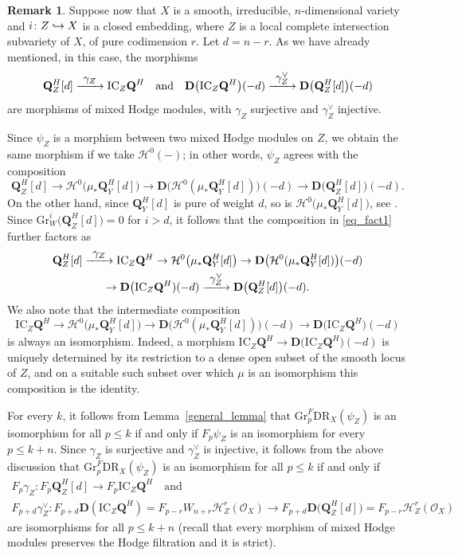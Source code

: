 \documentclass[JEP,XML,SOM,Unicode]{cedram}
\newcommand{\To}[1]{\mathchoice{\xrightarrow{\textstyle\kern4pt#1\kern3pt}}{\stackrel{#1}{\longrightarrow}}{}{}}
\newcommand\hto{\mathrel{\lhook\joinrel\to}}
\theoremstyle{plain}
\theoremstyle{definition}
\newtheorem{rmk}[thm]{Remark}
\newcommand\Q{{\mathbf Q}}
\newcommand\cH{\mathcal{H}}
\newcommand\cO{\mathcal{O}}
\newcommand\cH{\mathcal{H}}
\newcommand\cO{\mathcal{O}}
\newcommand\gr{\mathrm{Gr}}
\newcommand\DR{\mathrm{DR}}
\begin{document}
\begin{rmk}\label{rmk_two_morphisms}
Suppose now that $X$ is a smooth, irreducible, $n$-dimensional variety and $i\colon Z\hto X$ is a closed embedding,
where $Z$ is a local complete intersection subvariety of $X$, of pure codimension $r$. Let $d=n-r$.
As we have already mentioned, in this case, the morphisms
\[\Q^H_Z[d]\To{\gamma_Z}\mathrm{IC}_Z\Q^H\quad\text{and}\quad {\mathbf D}\big(\mathrm{IC}_Z\Q^H\big)(-d)
\To{\gamma_Z^{\vee}}{\mathbf D}\big(\Q^H_Z[d]\big)(-d)\]
are morphisms of mixed Hodge modules, with $\gamma_Z$ surjective and $\gamma_Z^{\vee}$ injective.

Since $\psi_Z$ is a morphism between two mixed Hodge modules on $Z$, we obtain the same morphism
if we take $\cH^0(-)$; in other words, $\psi_Z$ agrees with the composition
\begin{equation}\label{eq_fact1}
\Q_Z^H[d]\to \cH^0\big(\mu_*\Q_Y^H[d]\big)\to {\mathbf D}\big(\cH^0(\mu_*\Q_Y^H[d])\big)(-d)\to {\mathbf D}\big(\Q_Z^H[d]\big)(-d).
\end{equation}
On the other hand, since $\Q^H_Y[d]$ is pure of weight $d$, so is $\cH^0\big(\mu_*\Q_Y^H[d]\big)$, see \cite[(4.5.2)]{Saito_MHM}.
Since $\gr_W^i\big(\Q_Z^H[d]\big)=0$ for $i>d$, it follows that
the composition in \eqref{eq_fact1} further factors as
\begin{multline}\label{eq_fact2}
\Q_Z^H[d]\To{\gamma_Z} \mathrm{IC}_Z\Q^H\to \cH^0\big(\mu_*\Q_Y^H[d]\big)\to {\mathbf D}\big(\cH^0(\mu_*\Q_Y^H[d])\big)(-d)
\\
\to
{\mathbf D}\big(\mathrm{IC}_Z\Q^H)(-d)\To{\gamma_Z^{\vee}} {\mathbf D}\big(\Q_Z^H[d]\big)(-d).
\end{multline}
We also note that the intermediate composition
\[\mathrm{IC}_Z\Q^H\to \cH^0\big(\mu_*\Q_Y^H[d]\big)\to {\mathbf D}\big(\cH^0(\mu_*\Q_Y^H[d])\big)(-d)\to
{\mathbf D}\big(\mathrm{IC}_Z\Q^H)(-d)\]
is always an isomorphism. Indeed, a morphism $\mathrm{IC}_Z\Q^H\to {\mathbf D}\big(\mathrm{IC}_Z\Q^H)(-d)$ is uniquely determined
by its restriction to a dense open subset of the smooth locus of $Z$, and on a suitable such subset over which $\mu$ is an isomorphism
this composition is the identity.

For every $k$, it follows from Lemma~\ref{general_lemma} that $\gr_p^F\DR_X(\psi_Z)$ is an isomorphism for all $p\leq k$
if and only if $F_p\psi_Z$ is an isomorphism for every $p\leq k+n$. Since $\gamma_Z$ is surjective and $\gamma_Z^{\vee}$ is injective,
it follows from the above discussion that $\gr_p^F\DR_X(\psi_Z)$ is an isomorphism for all $p\leq k$ if and only if
\begin{gather*}
F_p\gamma_Z\colon F_p\Q_Z^H[d]\to F_p\mathrm{IC}_Z\Q^H\quad \text{and}\\
F_{p+d}\gamma_Z^{\vee} \colon F_{p+d}{\mathbf D}(\mathrm{IC}_Z\Q^H)=F_{p-r}W_{n+r}\cH^r_Z(\cO_X)\to
F_{p+d}{\mathbf D}\big(\Q_Z^H[d]\big)=F_{p-r}\cH_Z^r(\cO_X)
\end{gather*}
are isomorphisms for all $p\leq k+n$ (recall that every morphism of mixed Hodge modules preserves the Hodge filtration and it is strict).
\end{rmk}
\end{document}

